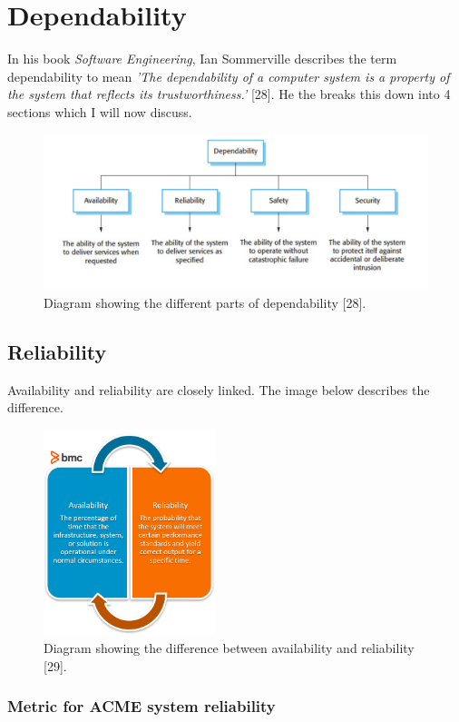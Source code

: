 \section{Dependability}
  \label{sec:Dependability}
  In his book \textit{Software Engineering}, Ian Sommerville describes the term dependability to mean \textit{'The dependability of a computer system 
  is a property of the system that reflects its trustworthiness.'} [28]. He the breaks this down into 4 sections which I will now discuss.

  \begin{figure}[H]
    \centering
    \includegraphics[width=12cm]{assets/dependability.png}
    \caption{Diagram showing the different parts of dependability [28].}
    \label{fig:dependability}
  \end{figure}

  \subsection{Reliability}
  Availability and reliability are closely linked. The image below describes the difference.
  \begin{figure}[H]
    \centering
    \includegraphics[width=5cm]{assets/avail-reliab.png}
    \caption{Diagram showing the difference between availability and reliability [29].}
    \label{fig:availabilityVsReliability}
  \end{figure}

  \subsubsection{Metric for ACME system reliability}

